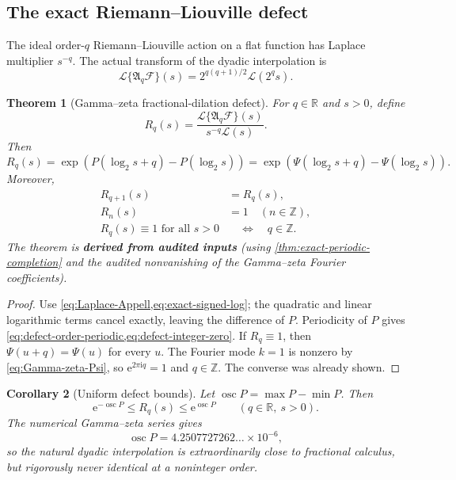 \documentclass[11pt]{article}
\newcommand{\statusderived}{\textcolor{statusblue}{\textbf{derived from audited inputs}}}
\newtheorem{theorem}{Theorem}[section]
\newtheorem{corollary}[theorem]{Corollary}
\theoremstyle{definition}
\theoremstyle{remark}
\newcommand{\R}{\mathbb R}
\newcommand{\Z}{\mathbb Z}
\newcommand{\ii}{\mathrm i}
\newcommand{\e}{\mathrm e}
\newcommand{\Laplace}{\mathcal L}
\newcommand{\extF}{\mathcal F}
\newcommand{\Aop}{\mathfrak A}
\begin{document}
\subsection{The exact Riemann--Liouville defect}

The ideal order-$q$ Riemann--Liouville action on a flat function has Laplace multiplier
$s^{-q}$.  The actual transform of the dyadic interpolation is
\begin{equation}
 \Laplace\{\Aop_q\extF\}(s)
 =2^{q(q+1)/2}\mathscr L(2^qs).
 \label{eq:Laplace-Appell}
\end{equation}

\begin{theorem}[Gamma--zeta fractional-dilation defect]
\label{thm:fractional-defect}
For $q\in\R$ and $s>0$, define
\begin{equation}
 R_q(s)=
 \frac{\Laplace\{\Aop_q\extF\}(s)}{s^{-q}\mathscr L(s)}.
 \label{eq:defect-def}
\end{equation}
Then
\begin{equation}
 \boxed{
 R_q(s)=\exp\!\left(P(\log_2s+q)-P(\log_2s)\right)
 =\exp\!\left(\Psi(\log_2s+q)-\Psi(\log_2s)\right).}
 \label{eq:defect-exact}
\end{equation}
Moreover,
\begin{align}
 R_{q+1}(s)&=R_q(s),\label{eq:defect-order-periodic}\\
 R_n(s)&=1\quad(n\in\Z),\label{eq:defect-integer-zero}\\
 R_q(s)\equiv1\text{ for all }s>0
 &\quad\Longleftrightarrow\quad q\in\Z.
 \label{eq:defect-rigidity}
\end{align}
The theorem is \statusderived{} (using \cref{thm:exact-periodic-completion} and the audited
nonvanishing of the Gamma--zeta Fourier coefficients).
\end{theorem}

\begin{proof}
Use \cref{eq:Laplace-Appell,eq:exact-signed-log}; the quadratic and linear logarithmic terms
cancel exactly, leaving the difference of $P$.  Periodicity of $P$ gives
\cref{eq:defect-order-periodic,eq:defect-integer-zero}.  If $R_q\equiv1$, then
$\Psi(u+q)=\Psi(u)$ for every $u$.  The Fourier mode $k=1$ is nonzero by
\cref{eq:Gamma-zeta-Psi}, so $\e^{2\pi\ii q}=1$ and $q\in\Z$.  The converse was already
shown.
\end{proof}

\begin{corollary}[Uniform defect bounds]
\label{cor:defect-bounds}
Let $\operatorname{osc}P=\max P-\min P$.  Then
\begin{equation}
 \e^{-\operatorname{osc}P}\le R_q(s)\le\e^{\operatorname{osc}P}
 \qquad(q\in\R,\ s>0).
 \label{eq:defect-uniform-bound}
\end{equation}
The numerical Gamma--zeta series gives
\begin{equation}
 \operatorname{osc}P=4.2507727262\ldots\times10^{-6},
 \label{eq:P-osc-numeric}
\end{equation}
so the natural dyadic interpolation is extraordinarily close to fractional calculus, but
rigorously never identical at a noninteger order.
\end{corollary}
\end{document}
